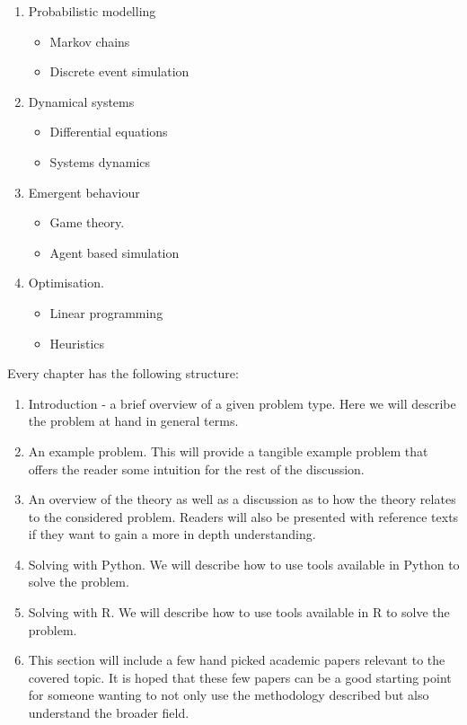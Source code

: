 \begin{enumerate}
    \item Probabilistic modelling
        \begin{itemize}
                \item Markov chains
                \item Discrete event simulation
        \end{itemize}
    \item Dynamical systems
        \begin{itemize}
                \item Differential equations
                \item Systems dynamics
        \end{itemize}
    \item Emergent behaviour
        \begin{itemize}
                \item Game theory.
                \item Agent based simulation
        \end{itemize}
    \item Optimisation.
        \begin{itemize}
                \item Linear programming
                \item Heuristics
        \end{itemize}
\end{enumerate}

Every chapter has the following structure:

\begin{enumerate}
\item
  Introduction - a brief overview of a given problem type. Here we will
  describe the problem at hand in general terms.
\item
  An example problem. This will provide a tangible example problem that
  offers the reader some intuition for the rest of the discussion.
\item
  An overview of the theory as well as a discussion as to how the theory relates
  to the considered problem. Readers will also be presented with reference
  texts if they want to gain a more in depth understanding.
\item
  Solving with Python. We will describe how to use tools available
  in Python to solve the problem.
\item
  Solving with R. We will describe how to use tools available
  in R to solve the problem.
\item
  This section will include a few hand picked academic papers relevant to the
  covered topic. It is hoped that these few papers can be a good starting point
  for someone wanting to not only use the methodology described but also
  understand the broader field.
\end{enumerate}

